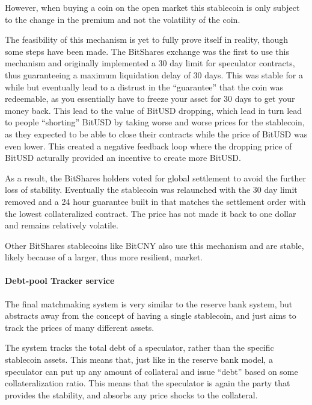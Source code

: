 \documentclass[english,]{IEEEtran}
\let\oldparagraph\paragraph
\renewcommand{\paragraph}[1]{\oldparagraph{#1}\mbox{}}
\begin{document}
However, when buying a coin on the open market this stablecoin is only
subject to the change in the premium and not the volatility of the coin.

The feasibility of this mechanism is yet to fully prove itself in
reality, though some steps have been made. The BitShares exchange was
the first to use this mechanism and originally implemented a 30 day
limit for speculator contracts, thus guaranteeing a maximum liquidation
delay of 30 days. This was stable for a while but eventually lead to a
distrust in the ``guarantee'' that the coin was redeemable, as you
essentially have to freeze your asset for 30 days to get your money
back. This lead to the value of BitUSD dropping, which lead in turn lead
to people ``shorting'' BitUSD by taking worse and worse prices for the
stablecoin, as they expected to be able to close their contracts while
the price of BitUSD was even lower. This created a negative feedback
loop where the dropping price of BitUSD acturally provided an incentive
to create more BitUSD.

As a result, the BitShares holders voted for global settlement to avoid
the further loss of stability. Eventually the stablecoin was relaunched
with the 30 day limit removed and a 24 hour guarantee built in that
matches the settlement order with the lowest collateralized contract.
The price has not made it back to one dollar and remains relatively
volatile.

Other BitShares stablecoins like BitCNY also use this mechanism and are
stable, likely because of a larger, thus more resilient, market.

\paragraph{Debt-pool Tracker service}\label{debt-pool-tracker-service}

The final matchmaking system is very similar to the reserve bank system,
but abstracts away from the concept of having a single stablecoin, and
just aims to track the prices of many different assets.

The system tracks the total debt of a speculator, rather than the
specific stablecoin assets. This means that, just like in the reserve
bank model, a speculator can put up any amount of collateral and issue
``debt'' based on some collateralization ratio. This means that the
speculator is again the party that provides the stability, and absorbs
any price shocks to the collateral.
\end{document}
